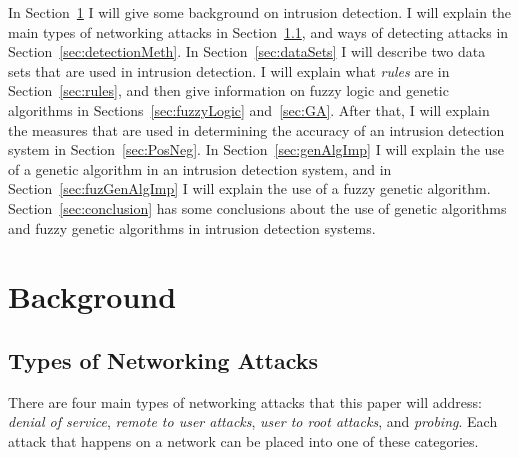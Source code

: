 \documentclass{sig-alternate}
\begin{document}
In Section~\ref{sec:background} I will give some background on intrusion detection. I will explain the main types of networking attacks in Section~\ref{sec:typesAttacks}, and ways of detecting attacks in Section~\ref{sec:detectionMeth}. In Section~\ref{sec:dataSets} I will describe two data sets that are used in intrusion detection. I will explain what \emph{rules} are in Section~\ref{sec:rules}, and then give information on fuzzy logic and genetic algorithms in Sections~\ref{sec:fuzzyLogic} and~\ref{sec:GA}. After that, I will explain the measures that are used in determining the accuracy of an intrusion detection system in Section~\ref{sec:PosNeg}. In Section~\ref{sec:genAlgImp} I will explain the use of a genetic algorithm in an intrusion detection system, and in Section~\ref{sec:fuzGenAlgImp} I will explain the use of a fuzzy genetic algorithm. Section~\ref{sec:conclusion} has some conclusions about the use of genetic algorithms and fuzzy genetic algorithms in intrusion detection systems.




\section{Background}
\label{sec:background}

\subsection{Types of Networking Attacks}
\label{sec:typesAttacks}
There are four main types of networking attacks that this paper will address: \emph{denial of service}, \emph{remote to user attacks}, \emph{user to root attacks}, and \emph{probing}. Each attack that happens on a network can be placed into one of these categories.~\cite{DBLP:journals/corr/abs-1204-1336}
\end{document}
